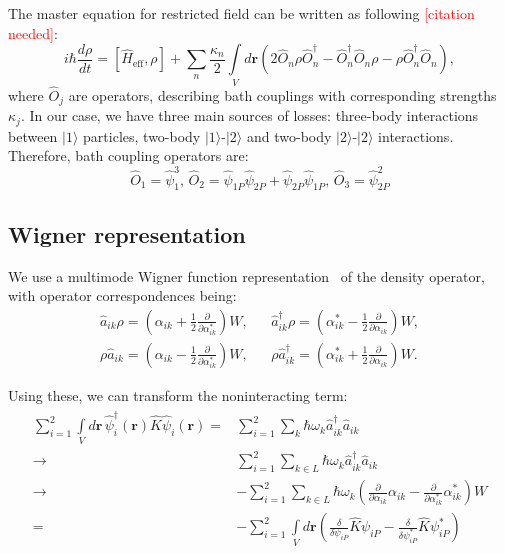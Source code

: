 \documentclass[12pt,notitlepage]{report}
\begin{document}
The master equation for restricted field can be written as following \textcolor{red}{[citation needed]}:
\[
i \hbar \frac{d\rho}{d t} = [\hat{H}_{\textrm{eff}}, \rho] + \sum\limits_n \frac{\kappa_n}{2} \int\limits_V d\mathbf{r}
\left( 2  \hat{O}_n \rho \hat{O}_n^\dagger - \hat{O}_n^\dagger \hat{O}_n \rho - \rho \hat{O}_n^\dagger \hat{O}_n \right),
\]
where $\hat{O}_j$ are operators, describing bath couplings with corresponding strengths $\kappa_j$.
In our case, we have three main sources of losses: three-body interactions between $\vert1\rangle$ particles,
two-body $\vert1\rangle$-$\vert2\rangle$ and two-body $\vert2\rangle$-$\vert2\rangle$ interactions.
Therefore, bath coupling operators are:
\[
\hat{O}_1 = \hat{\psi}_1^3,\, \hat{O}_2 = \hat{\psi}_{1P} \hat{\psi}_{2P} + \hat{\psi}_{2P} \hat{\psi}_{1P},\, \hat{O}_3 = \hat{\psi}_{2P}^2
\]

\subsection{Wigner representation}

We use a multimode Wigner function representation~\cite{gardiner_quantum_noise} of the density operator,
with operator correspondences being:
\begin{align*}
\hat{a}_{ik} \rho = \left( \alpha_{ik} + \frac{1}{2} \frac{\partial}{\partial \alpha_{ik}^*} \right) W, & &
\hat{a}_{ik}^\dagger \rho = \left( \alpha_{ik}^* - \frac{1}{2} \frac{\partial}{\partial \alpha_{ik}} \right) W, \\
\rho \hat{a}_{ik} = \left( \alpha_{ik} - \frac{1}{2} \frac{\partial}{\partial \alpha_{ik}^*} \right) W, & &
\rho \hat{a}_{ik}^\dagger = \left( \alpha_{ik}^* + \frac{1}{2} \frac{\partial}{\partial \alpha_{ik}} \right) W.
\end{align*}

Using these, we can transform the noninteracting term:
\begin{align*}
\begin{split}
\sum\limits^2_{i=1}\int\limits_V d\mathbf{r} \, \hat{\psi}_i^\dagger(\mathbf{r}) \hat{K} \hat{\psi}_i(\mathbf{r}) = &
\sum\limits_{i=1}^2 \sum\limits_k \hbar \omega_{k} \hat{a}_{ik}^\dagger \hat{a}_{ik} \\
\rightarrow {} & \sum\limits_{i=1}^2 \sum\limits_{k \in L} \hbar \omega_{k} \hat{a}_{ik}^\dagger \hat{a}_{ik} \\
\rightarrow {} & - \sum\limits_{i=1}^2 \sum\limits_{k \in L} \hbar \omega_k \left(
	\frac{\partial}{\partial \alpha_{ik}} \alpha_{ik} - \frac{\partial}{\partial \alpha_{ik}^*} \alpha_{ik}^*
\right) W \\
= {} & - \sum\limits_{i=1}^2 \int\limits_V d\mathbf{r} \left(
	\frac{\delta}{\delta \psi_{iP}} \hat{K} \psi_{iP} - \frac{\delta}{\delta \psi_{iP}^*} \hat{K} \psi_{iP}^*
\right)
\end{split}
\end{align*}
\end{document}
